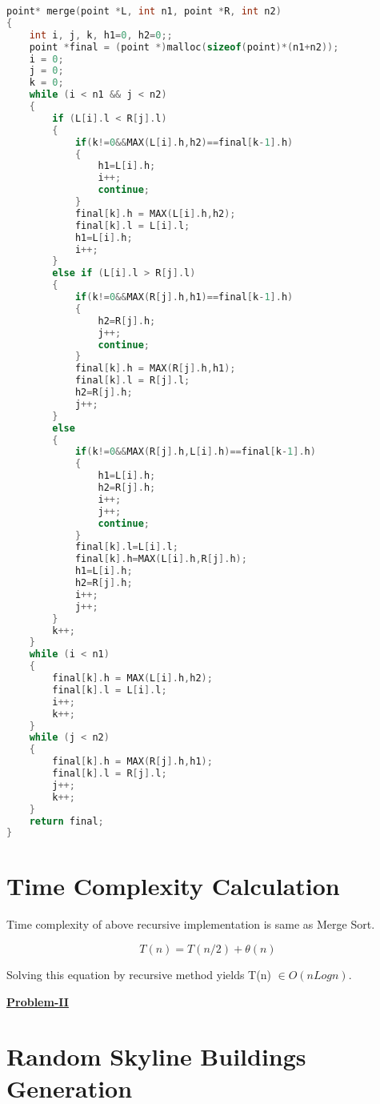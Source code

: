 \documentclass{article}
\begin{document}
\begin{lstlisting}[language=c, caption=merging function]
point* merge(point *L, int n1, point *R, int n2)
{
    int i, j, k, h1=0, h2=0;;
    point *final = (point *)malloc(sizeof(point)*(n1+n2));
    i = 0;
    j = 0;
    k = 0;
    while (i < n1 && j < n2)
    {
        if (L[i].l < R[j].l)
        {
            if(k!=0&&MAX(L[i].h,h2)==final[k-1].h)
            {
                h1=L[i].h;
                i++;
                continue;         
            }
            final[k].h = MAX(L[i].h,h2);
            final[k].l = L[i].l;
            h1=L[i].h;
            i++;
        }
        else if (L[i].l > R[j].l)
        {
            if(k!=0&&MAX(R[j].h,h1)==final[k-1].h)
            {
                h2=R[j].h;
                j++;
                continue;
            }
            final[k].h = MAX(R[j].h,h1);
            final[k].l = R[j].l;
            h2=R[j].h;
            j++;
        }
        else
        {
            if(k!=0&&MAX(R[j].h,L[i].h)==final[k-1].h)
            {
                h1=L[i].h;
                h2=R[j].h;
                i++;
                j++;
                continue;
            }
            final[k].l=L[i].l;
            final[k].h=MAX(L[i].h,R[j].h);
            h1=L[i].h;
            h2=R[j].h;
            i++;
            j++;
        }
        k++;
    }
    while (i < n1)
    {
        final[k].h = MAX(L[i].h,h2);
        final[k].l = L[i].l;
        i++;
        k++;
    }
    while (j < n2)
    {
        final[k].h = MAX(R[j].h,h1);
        final[k].l = R[j].l;
        j++;
        k++;
    }
    return final;
}
\end{lstlisting}

\section{Time Complexity Calculation}

Time complexity of above recursive implementation is same as Merge Sort.

\[ T(n) = T(n/2) + \theta(n) \]

Solving this equation by recursive method yields T(n) $\in O(nLogn)$.

\clearpage

\underline {\textbf{Problem-II}}

\section{Random Skyline Buildings Generation}
\end{document}
